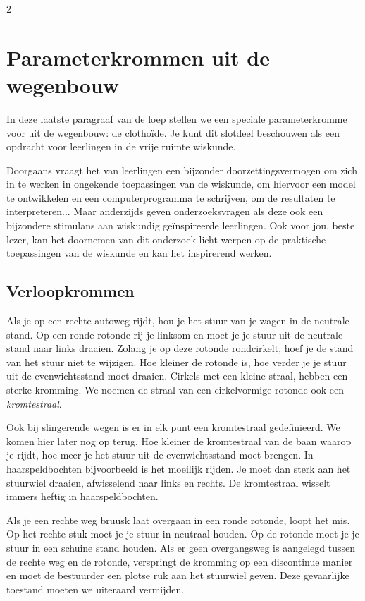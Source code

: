 \begin{multicols}{2}
\begin{itemize}
\end{itemize}


\section{Parameterkrommen uit de wegenbouw}

In deze laatste paragraaf van de loep stellen we een speciale parameterkromme voor uit de  wegenbouw: de clothoïde. Je kunt dit slotdeel beschouwen als een opdracht voor leerlingen in de vrije ruimte wiskunde. 

Doorgaans vraagt het van leerlingen een bijzonder doorzettingsvermogen om zich in te werken in ongekende toepassingen van de wiskunde, om hiervoor een model te ontwikkelen en een computerprogramma te schrijven, om de resultaten te interpreteren... Maar anderzijds geven onderzoeksvragen als deze ook een bijzondere stimulans aan wiskundig geïnspireerde leerlingen. Ook voor jou, beste lezer, kan het doornemen van dit onderzoek licht werpen op de praktische toepassingen van de wiskunde en kan het inspirerend werken.


\subsection{Verloopkrommen}

Als je op een rechte autoweg rijdt, hou je het stuur van je wagen in de neutrale stand. Op een ronde rotonde rij je linksom en moet je je stuur uit de neutrale stand naar links draaien. Zolang je op deze rotonde rondcirkelt, hoef je de stand van het stuur niet te wijzigen. Hoe kleiner de rotonde is, hoe verder je je stuur uit de evenwichtsstand moet draaien. Cirkels met een kleine straal, hebben een sterke kromming. We noemen de straal van een cirkelvormige rotonde ook een \emph{kromtestraal}.

Ook bij slingerende wegen is er in elk punt een kromtestraal gedefinieerd. We komen hier later nog op terug. Hoe kleiner de kromtestraal van de baan waarop je rijdt, hoe meer je het stuur uit de evenwichtsstand moet brengen. In haarspeldbochten bijvoorbeeld is het moeilijk rijden. Je moet dan sterk aan het stuurwiel draaien, afwisselend naar links en rechts. De kromtestraal wisselt immers heftig in haarspeldbochten.

Als je een rechte weg bruusk laat overgaan in een ronde rotonde, loopt het mis. Op het rechte stuk moet je je stuur in neutraal houden. Op de rotonde moet je je stuur in een schuine stand houden. Als er geen overgangsweg is aangelegd tussen de rechte weg en de rotonde, verspringt de kromming op een discontinue manier en moet de bestuurder een plotse ruk aan het stuurwiel geven. Deze gevaarlijke toestand moeten we uiteraard vermijden. 


\end{multicols}
